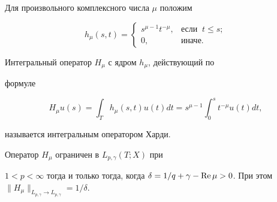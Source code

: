Для произвольного комплексного числа $\mu$ положим


$$


h_\mu(s,t) =


\begin{cases}


s^{\mu-1}t^{-\mu}, & \text{если } \ t \le s;\\


0, & \text{иначе.}


\end{cases}


$$


Интегральный оператор $H_\mu$ с ядром $h_\mu$, действующий по


формуле


$$


H_\mu u(s)=\int_T h_\mu(s,t) u(t) d t =


s^{\mu-1}\int_0^s t^{-\mu} u(t) d t,


$$


называется интегральным оператором Харди.





\begin{thms}\label{HinLp}


Оператор $H_\mu$ ограничен в $L_{p,\gamma}(T;X)$ при


$1<p<\infty$ тогда и только тогда, когда $\delta =1/q+\gamma-\re 


\mu >0$. При этом $\|H_\mu\|_{L_{p,\gamma} \to


L_{p,\gamma}}=1/\delta$.


\end{thms}





